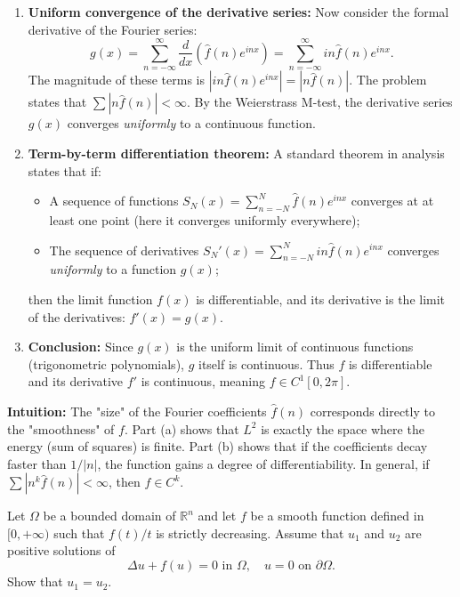 \begin{solution}
\begin{enumerate}
    \item \textbf{Uniform convergence of the derivative series:}
    Now consider the formal derivative of the Fourier series:
    \[ g(x) = \sum_{n=-\infty}^\infty \frac{d}{dx} \left( \hat{f}(n) e^{inx} \right) = \sum_{n=-\infty}^\infty in \hat{f}(n) e^{inx}. \]
    The magnitude of these terms is $|in \hat{f}(n) e^{inx}| = |n \hat{f}(n)|$.
    The problem states that $\sum |n \hat{f}(n)| < \infty$. By the Weierstrass M-test, the derivative series $g(x)$ converges \textit{uniformly} to a continuous function.

    \item \textbf{Term-by-term differentiation theorem:}
    A standard theorem in analysis states that if:
    \begin{itemize}
        \item A sequence of functions $S_N(x) = \sum_{n=-N}^N \hat{f}(n) e^{inx}$ converges at at least one point (here it converges uniformly everywhere);
        \item The sequence of derivatives $S_N'(x) = \sum_{n=-N}^N in \hat{f}(n) e^{inx}$ converges \textit{uniformly} to a function $g(x)$;
    \end{itemize}
    then the limit function $f(x)$ is differentiable, and its derivative is the limit of the derivatives: $f'(x) = g(x)$.

    \item \textbf{Conclusion:} Since $g(x)$ is the uniform limit of continuous functions (trigonometric polynomials), $g$ itself is continuous. Thus $f$ is differentiable and its derivative $f'$ is continuous, meaning $f \in C^1[0, 2\pi]$.
\end{enumerate}

\textbf{Intuition:}
The "size" of the Fourier coefficients $\hat{f}(n)$ corresponds directly to the "smoothness" of $f$. Part (a) shows that $L^2$ is exactly the space where the energy (sum of squares) is finite. Part (b) shows that if the coefficients decay faster than $1/|n|$, the function gains a degree of differentiability. In general, if $\sum |n^k \hat{f}(n)| < \infty$, then $f \in C^k$.
\end{solution}

\begin{exercise}
\label{analysis:2010:12}
Let $\Omega$ be a bounded domain of $\mathbb{R}^n$ and let $f$ be a smooth function defined in $[0, +\infty)$ such that $f(t)/t$ is strictly decreasing. Assume that $u_1$ and $u_2$ are positive solutions of
\[
\Delta u + f(u) = 0 \text{ in } \Omega, \quad u = 0 \text{ on } \partial \Omega.
\]
Show that $u_1 = u_2$.
\end{exercise}

